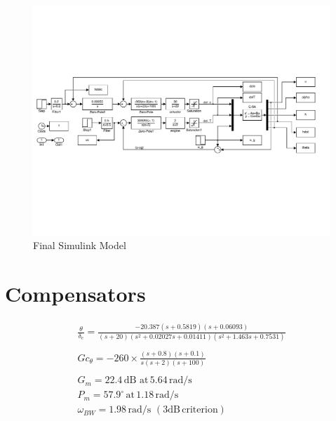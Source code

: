 \documentclass[11pt]{article}
\begin{document}
\begin{figure}[b!]
\begin{center}
\includegraphics[width=1\textwidth]{figures/final_simulink}
\caption{Final Simulink Model}
\end{center}
\end{figure}

\clearpage
\section{Compensators}

\begin{gather*}
\frac{\theta}{\delta_e}=\frac{-20.387 (s+0.5819) (s+0.06093)}{(s+20) (s^2 + 0.02027s + 0.01411) (s^2 + 1.463s + 0.7531)} \\
\\
\boxed{Gc_{\theta} = -260 \times \frac{(s+0.8)(s+0.1)}{s(s+2)(s+100)}} \\
\\
G_m=22.4\,\mathrm{dB\,\, at\,} 5.64 \,\mathrm{rad/s}  \\
P_m=57.9^{\circ}\, \mathrm{at}\, 1.18 \,\mathrm{rad/s} \\
\omega_{BW}=1.98\, \mathrm{rad/s}\,\mathrm{\,(3 dB\, criterion)}\\
\end{gather*}
\end{document}
